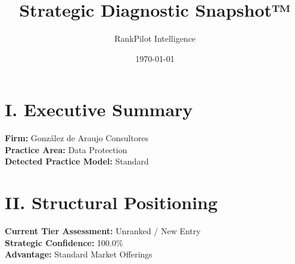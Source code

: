 \documentclass[11pt]{article}
\title{\textbf{Strategic Diagnostic Snapshot™}}
\author{RankPilot Intelligence}
\date{\today}
\begin{document}
\maketitle

\section*{I. Executive Summary}
\textbf{Firm:} González de Araujo Consultores \\
\textbf{Practice Area:} Data Protection \\
\textbf{Detected Practice Model:} Standard

\section*{II. Structural Positioning}
\textbf{Current Tier Assessment:} Unranked / New Entry \\
\textbf{Strategic Confidence:} 100.0\% \\
\textbf{Advantage:} Standard Market Offerings
\end{document}
